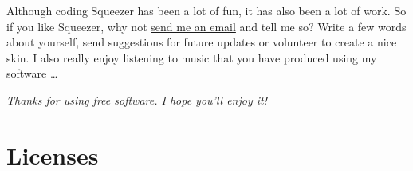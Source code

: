 Although coding Squeezer has been a lot of fun, it has also been a lot
of work.  So if you like Squeezer, why not
\href{http://www.mzuther.de/}{send me an email} and tell me so?  Write
a few words about yourself, send suggestions for future updates or
volunteer to create a nice skin.  I also really enjoy listening to
music that you have produced using my software \dots

\emph{Thanks for using free software.  I hope you'll enjoy it!}

\appendix



\chapter{Licenses}

\scriptsize

\normalsize

\scriptsize

\normalsize




